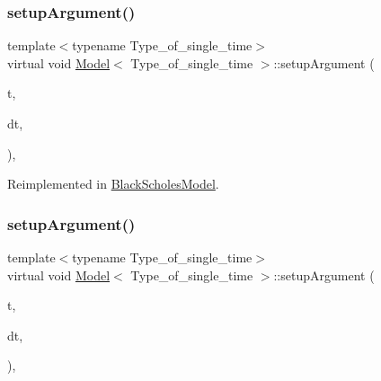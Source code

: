 \subsubsection{\texorpdfstring{setup\+Argument()}{setupArgument()}\hspace{0.1cm}{\footnotesize\ttfamily [1/2]}}
{\footnotesize\ttfamily template$<$typename Type\+\_\+of\+\_\+single\+\_\+time$>$ \\
virtual void \hyperlink{class_model}{Model}$<$ Type\+\_\+of\+\_\+single\+\_\+time $>$\+::setup\+Argument (\begin{DoxyParamCaption}\item[{\hyperlink{_name_def_8h_ac2d3e0ba793497bcca555c7c2cf64ff3}{Time}}]{t,  }\item[{\hyperlink{_name_def_8h_ac2d3e0ba793497bcca555c7c2cf64ff3}{Time}}]{dt,  }\item[{\hyperlink{class_generic_random_variable_generator_1_1_argument}{Generic\+Random\+Variable\+Generator\+::\+Argument} $\ast$}]{ }\end{DoxyParamCaption})\hspace{0.3cm}{\ttfamily [inline]}, {\ttfamily [virtual]}}



Reimplemented in \hyperlink{class_black_scholes_model_a04a6ba4c59cd70a92dedbeb482e9d5aa}{Black\+Scholes\+Model}.

\hypertarget{class_model_a603717845fc9c6317d65a39409d10aed}{}\label{class_model_a603717845fc9c6317d65a39409d10aed} 
\subsubsection{\texorpdfstring{setup\+Argument()}{setupArgument()}\hspace{0.1cm}{\footnotesize\ttfamily [2/2]}}
{\footnotesize\ttfamily template$<$typename Type\+\_\+of\+\_\+single\+\_\+time$>$ \\
virtual void \hyperlink{class_model}{Model}$<$ Type\+\_\+of\+\_\+single\+\_\+time $>$\+::setup\+Argument (\begin{DoxyParamCaption}\item[{\hyperlink{_name_def_8h_ac2d3e0ba793497bcca555c7c2cf64ff3}{Time}}]{t,  }\item[{\hyperlink{_name_def_8h_ac2d3e0ba793497bcca555c7c2cf64ff3}{Time}}]{dt,  }\item[{vector$<$ \hyperlink{class_generic_random_variable_generator_1_1_argument}{Generic\+Random\+Variable\+Generator\+::\+Argument} $\ast$$>$}]{ }\end{DoxyParamCaption})\hspace{0.3cm}{\ttfamily [inline]}, {\ttfamily [virtual]}}



